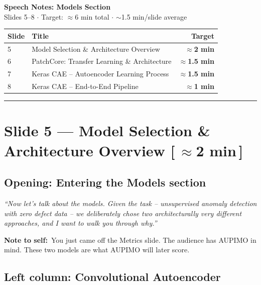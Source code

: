 \documentclass[12pt, a4paper]{article}
\newcommand{\say}[1]{%
  \begin{mdframed}[style=saybox]
  \itshape ``#1''
  \end{mdframed}
}
\newcommand{\aside}[1]{%
  \begin{mdframed}[style=notebox]
  \textbf{\color{notegreen}Note to self:}\ #1
  \end{mdframed}
}
\newcommand{\timing}[1]{\hfill{\small\color{muted}[\,\textbf{#1}\,]}}
\begin{document}
\begin{center}
  {\Large\bfseries Speech Notes: Models Section}\\[4pt]
  {\normalsize\color{muted} Slides 5--8 $\cdot$ Target: $\approx$6 min total $\cdot$ $\sim$1.5 min/slide average}\\[6pt]
  \begin{tabular}{@{}llr@{}}
    \toprule
    Slide & Title & Target \\
    \midrule
    5 & Model Selection \& Architecture Overview & \textbf{$\approx$2 min} \\
    6 & PatchCore: Transfer Learning \& Architecture & \textbf{$\approx$1.5 min} \\
    7 & Keras CAE -- Autoencoder Learning Process & \textbf{$\approx$1.5 min} \\
    8 & Keras CAE -- End-to-End Pipeline & \textbf{$\approx$1 min} \\
    \bottomrule
  \end{tabular}
\end{center}
\rule{\linewidth}{1.5pt}

\section{Slide 5 --- Model Selection \& Architecture Overview \timing{$\approx$2 min}}

\subsection{Opening: Entering the Models section}

\say{Now let's talk about the models. Given the task -- unsupervised anomaly detection with zero defect data -- we deliberately chose two architecturally very different approaches, and I want to walk you through why.}

\aside{You just came off the Metrics slide. The audience has AUPIMO in mind. These two models are what AUPIMO will later score.}

\subsection{Left column: Convolutional Autoencoder}
\end{document}
